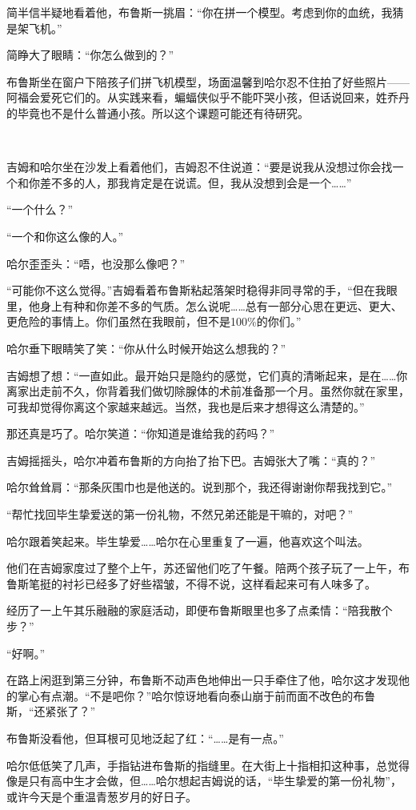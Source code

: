 \documentclass[../main]{subfiles}
\begin{document}
简半信半疑地看着他，布鲁斯一挑眉：“你在拼一个模型。考虑到你的血统，我猜是架飞机。”

简睁大了眼睛：“你怎么做到的？”

布鲁斯坐在窗户下陪孩子们拼飞机模型，场面温馨到哈尔忍不住拍了好些照片——阿福会爱死它们的。从实践来看，蝙蝠侠似乎不能吓哭小孩，但话说回来，姓乔丹的毕竟也不是什么普通小孩。所以这个课题可能还有待研究。

~\

吉姆和哈尔坐在沙发上看着他们，吉姆忍不住说道：“要是说我从没想过你会找一个和你差不多的人，那我肯定是在说谎。但，我从没想到会是一个……”

“一个什么？”

“一个和你这么像的人。”

哈尔歪歪头：“唔，也没那么像吧？”

“可能你不这么觉得。”吉姆看着布鲁斯粘起落架时稳得非同寻常的手，“但在我眼里，他身上有种和你差不多的气质。怎么说呢……总有一部分心思在更远、更大、更危险的事情上。你们虽然在我眼前，但不是100\%的你们。”

哈尔垂下眼睛笑了笑：“你从什么时候开始这么想我的？”

吉姆想了想：“一直如此。最开始只是隐约的感觉，它们真的清晰起来，是在……你离家出走前不久，你背着我们做切除腺体的术前准备那一个月。虽然你就在家里，可我却觉得你离这个家越来越远。当然，我也是后来才想得这么清楚的。”

那还真是巧了。哈尔笑道：“你知道是谁给我的药吗？”

吉姆摇摇头，哈尔冲着布鲁斯的方向抬了抬下巴。吉姆张大了嘴：“真的？”

哈尔耸耸肩：“那条灰围巾也是他送的。说到那个，我还得谢谢你帮我找到它。”

“帮忙找回毕生挚爱送的第一份礼物，不然兄弟还能是干嘛的，对吧？”

哈尔跟着笑起来。毕生挚爱……哈尔在心里重复了一遍，他喜欢这个叫法。

他们在吉姆家度过了整个上午，苏还留他们吃了午餐。陪两个孩子玩了一上午，布鲁斯笔挺的衬衫已经多了好些褶皱，不得不说，这样看起来可有人味多了。

经历了一上午其乐融融的家庭活动，即便布鲁斯眼里也多了点柔情：“陪我散个步？”

“好啊。”

在路上闲逛到第三分钟，布鲁斯不动声色地伸出一只手牵住了他，哈尔这才发现他的掌心有点潮。“不是吧你？”哈尔惊讶地看向泰山崩于前而面不改色的布鲁斯，“还紧张了？”

布鲁斯没看他，但耳根可见地泛起了红：“……是有一点。”

哈尔低低笑了几声，手指钻进布鲁斯的指缝里。在大街上十指相扣这种事，总觉得像是只有高中生才会做，但……哈尔想起吉姆说的话，“毕生挚爱的第一份礼物”，或许今天是个重温青葱岁月的好日子。
\end{document}
